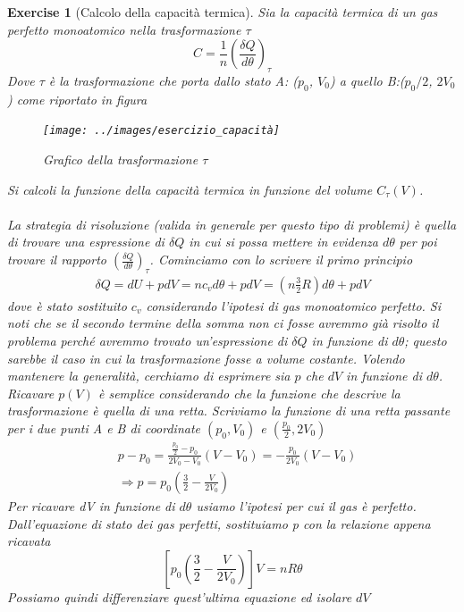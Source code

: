 \documentclass[10pt,a4paper]{article}
\newtheorem{exercise}{Exercise}
\begin{document}
\begin{exercise}[Calcolo della capacità termica]
Sia la capacità termica di un gas perfetto monoatomico nella trasformazione $\tau$ \[C = \frac{1}{n}\left(\frac{\delta Q}{d\theta}\right)_{\tau}\] 
Dove $\tau$ è la trasformazione che porta dallo stato A: ($p_0$, $V_0$) a quello B:($p_0/2$, $2V_0$) come riportato in figura
\begin{figure}[h!]
	\centering
	\texttt{[image: ../images/esercizio\_capacità]}
	\caption{Grafico della trasformazione $\tau$}
	\label{fig:eserciziocapacita}
\end{figure}
\FloatBarrier
Si calcoli la funzione della capacità termica in funzione del volume \(C_{\tau}(V)\).\\\\

La strategia di risoluzione (valida in generale per questo tipo di problemi) è quella di trovare una espressione di $\delta Q$ in cui si possa mettere in evidenza \(d\theta\) per poi trovare il rapporto \(\left(\frac{\delta Q}{d\theta}\right)_{\tau}\). Cominciamo con lo scrivere il primo principio 
\begin{align*}
	\delta Q = dU + pdV = n c_v d\theta + pdV = \left(n \frac{3}{2} R\right) d\theta + pdV
\end{align*} 
dove è stato sostituito $c_v$ considerando l'ipotesi di gas monoatomico perfetto. Si noti che se il secondo termine della somma non ci fosse avremmo già risolto il problema perché avremmo trovato un'espressione di $\delta Q$ in funzione di $d\theta$; questo sarebbe il caso in cui la trasformazione fosse a volume costante. Volendo mantenere la generalità, cerchiamo di esprimere sia $p$ che $dV$ in funzione di $d\theta$. Ricavare \(p(V)\) è semplice considerando che la funzione che descrive la trasformazione è quella di una retta. Scriviamo la funzione di una retta passante per i due punti A e B di coordinate \((p_0, V_0)\) e \((\frac{p_0}{2}, 2 V_0)\)
\begin{align*}
	&p-p_0 = \frac{\frac{p_0}{2}-p_0}{2V_0 - V_0}(V-V_0) = -\frac{p_0}{2V_0}(V-V_0) \\
	&\Rightarrow p = p_0 \left(\frac{3}{2} - \frac{V}{2 V_0}\right)
\end{align*}  
Per ricavare dV in funzione di $d\theta$ usiamo l'ipotesi per cui il gas è perfetto. Dall'equazione di stato dei gas perfetti, sostituiamo p con la relazione appena ricavata
\[\left[p_0\left(\frac{3}{2} - \frac{V}{2 V_0} \right) \right] V = n R \theta \] 
Possiamo quindi differenziare quest'ultima equazione ed isolare $dV$

\end{exercise}
\end{document}
